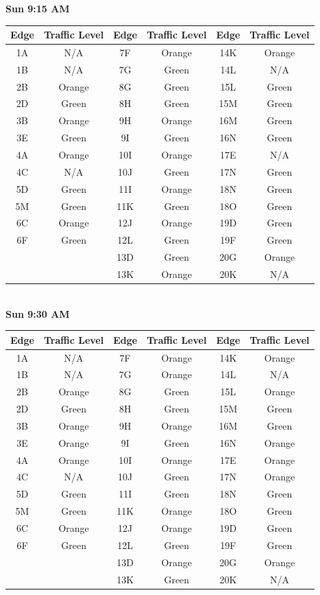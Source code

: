 \documentclass{article}
\begin{document}
\textbf{Sun 9:15 AM} \\

\begin{tabular}{|c|c||c|c||c|c|}\hline
Edge & Traffic Level & Edge & Traffic Level & Edge & Traffic Level \\ \hline
1A & N/A & 7F & Orange & 14K & Orange \\ 
1B & N/A & 7G & Green & 14L & N/A \\ \hline
2B & Orange & 8G & Green & 15L & Green \\ 
2D & Green & 8H & Green & 15M & Green \\ \hline
3B & Orange & 9H & Orange & 16M & Green \\ 
3E & Green & 9I & Green & 16N & Green \\ \hline 
4A & Orange & 10I & Orange & 17E & N/A \\ 
4C & N/A & 10J & Green & 17N & Green \\ \hline
5D & Green & 11I & Orange & 18N & Green \\ 
5M & Green & 11K & Green & 18O & Green \\ \hline 
6C & Orange & 12J & Orange & 19D & Green \\ 
6F & Green & 12L & Green & 19F & Green \\ \hline 
& & 13D & Green & 20G & Orange \\
& & 13K & Orange & 20K & N/A \\ \hline
\end{tabular} \\

\textbf{Sun 9:30 AM} \\

\begin{tabular}{|c|c||c|c||c|c|}\hline
Edge & Traffic Level & Edge & Traffic Level & Edge & Traffic Level \\ \hline
1A & N/A & 7F & Orange & 14K & Orange \\ 
1B & N/A & 7G & Orange & 14L & N/A \\ \hline
2B & Orange & 8G & Green & 15L & Orange \\ 
2D & Green & 8H & Green & 15M & Green \\ \hline
3B & Orange & 9H & Orange & 16M & Green \\ 
3E & Orange & 9I & Green & 16N & Orange \\ \hline 
4A & Orange & 10I & Orange & 17E & Orange \\ 
4C & N/A & 10J & Green & 17N & Orange \\ \hline
5D & Green & 11I & Green & 18N & Green \\ 
5M & Green & 11K & Orange & 18O & Green \\ \hline 
6C & Orange & 12J & Orange & 19D & Green \\ 
6F & Green & 12L & Green & 19F & Green \\ \hline 
& & 13D & Orange & 20G & Orange \\
& & 13K & Green & 20K & N/A \\ \hline
\end{tabular} \\
\end{document}
